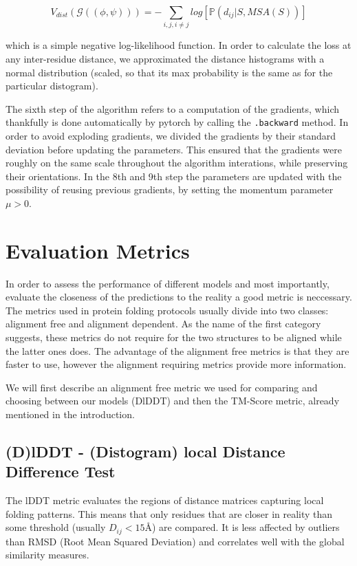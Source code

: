 \begin{equation}
     V_{dist}(\mathcal{G}((\phi, \psi))) = -\sum_{i, j, i \neq j} log[\mathds{P} (d_{ij} | S, MSA(S))]
     \label{eq:dist_pot}
\end{equation}

which is a simple negative log-likelihood function. In order to calculate the loss at any inter-residue distance, we approximated the distance histograms with a normal distribution (scaled, so that its max probability is the same as for the particular distogram).

The sixth step of the algorithm refers to a computation of the gradients, which thankfully is done automatically by pytorch by calling the \texttt{.backward} method. In order to avoid exploding gradients, we divided the gradients by their standard deviation before updating the parameters. This ensured that the gradients were roughly on the same scale throughout the algorithm interations, while preserving their orientations. In the 8th and 9th step the parameters are updated with the possibility of reusing previous gradients, by setting the momentum parameter $\mu > 0$.

\section{Evaluation Metrics}

In order to assess the performance of different models and most importantly, evaluate the closeness of the predictions to the reality a good metric is neccessary. The metrics used in protein folding protocols usually divide into two classes: alignment free and alignment dependent. As the name of the first category suggests, these metrics do not require for the two structures to be aligned while the latter ones does. The advantage of the alignment free metrics is that they are faster to use, however the alignment requiring metrics provide more information. 

We will first describe an alignment free metric we used for comparing and choosing between our models (DlDDT) and then the TM-Score metric, already mentioned in the introduction.

\subsection{(D)lDDT - (Distogram) local Distance Difference Test}

The lDDT metric evaluates the regions of distance matrices capturing local folding patterns. This means that only residues that are closer in reality than some threshold (usually $D_{ij} < 15$\AA) are compared. It is less affected by outliers than RMSD (Root Mean Squared Deviation) and correlates well with the global similarity measures.

